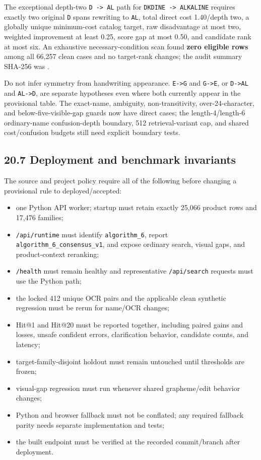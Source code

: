 The exceptional depth-two \texttt{D\ -\textgreater{}\ AL} path for \texttt{DKDINE\ -\textgreater{}\ ALKALINE} requires exactly two original \texttt{D} spans rewriting to \texttt{AL}, total direct cost 1.40/depth two, a globally unique minimum-cost catalog target, raw disadvantage at most two, weighted improvement at least 0.25, score gap at most 0.50, and candidate rank at most six. An exhaustive necessary-condition scan found \textbf{zero eligible rows} among all 66,257 clean cases and no target-rank changes; the audit summary SHA-256 was \texttt{}.

Do not infer symmetry from handwriting appearance. \texttt{E-\textgreater{}G} and \texttt{G-\textgreater{}E}, or \texttt{D-\textgreater{}AL} and \texttt{AL-\textgreater{}D}, are separate hypotheses even where both currently appear in the provisional table. The exact-name, ambiguity, non-transitivity, over-24-character, and below-five-visible-gap guards now have direct cases; the length-4/length-6 ordinary-name confusion-depth boundary, 512 retrieval-variant cap, and shared cost/confusion budgets still need explicit boundary tests.

\subsection{20.7 Deployment and benchmark invariants}\label{207-deployment-and-benchmark-invariants}

The source and project policy require all of the following before changing a provisional rule to deployed/accepted:

\begin{itemize}
\tightlist
\item
  one Python API worker; startup must retain exactly 25,066 product rows and 17,476 families;
\item
  \texttt{/api/runtime} must identify \texttt{algorithm\_\allowbreak{}6}, report \texttt{algorithm\_\allowbreak{}6\_\allowbreak{}consensus\_\allowbreak{}v1}, and expose ordinary search, visual gaps, and product-context reranking;
\item
  \texttt{/health} must remain healthy and representative \texttt{/api/search} requests must use the Python path;
\item
  the locked 412 unique OCR pairs and the applicable clean synthetic regression must be rerun for name/OCR changes;
\item
  Hit@1 and Hit@20 must be reported together, including paired gains and losses, unsafe confident errors, clarification behavior, candidate counts, and latency;
\item
  target-family-disjoint holdout must remain untouched until thresholds are frozen;
\item
  visual-gap regression must run whenever shared grapheme/edit behavior changes;
\item
  Python and browser fallback must not be conflated; any required fallback parity needs separate implementation and tests;
\item
  the built endpoint must be verified at the recorded commit/branch after deployment.
\end{itemize}

